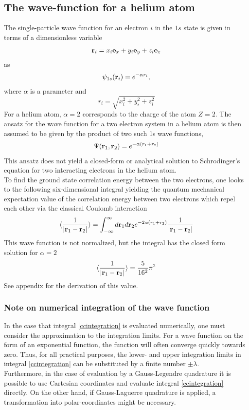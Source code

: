 \documentclass[%
reprint,
amsmath,amssymb,
aps,
]{revtex4-1}
\begin{document}
\subsection{The wave-function for a helium atom} \noindent 
The single-particle wave function for an electron $i$ in the $1s$ state is given in terms of a dimensionless variable 
\begin{equation*}
	 {\bf r}_i =  x_i {\bf e}_x + y_i {\bf e}_y +z_i {\bf e}_z 
\end{equation*}
as 
\begin{equation*}
	\psi_{1s}({\bf r}_i)  =   e^{-\alpha r_i},
\end{equation*}
where $\alpha$ is a parameter and 
\begin{equation*}
	r_i = \sqrt{x_i^2+y_i^2+z_i^2}
\end{equation*}
For a helium atom, $\alpha = 2$ corresponds to the charge of the atom $Z = 2$. The ansatz for the wave function for a two electron system in a helium atom is then assumed to be given by the product of two such 1s wave functions, 
\begin{equation}\label{waveequation}
	\Psi({\bf r}_1,{\bf r}_2)  =   e^{-\alpha (r_1+r_2)}
\end{equation}
This ansatz does not yield a closed-form or analytical solution to Schrodinger's equation for two interacting electrons in the helium atom. \\ \indent 
To find the ground state correlation energy between the two electrons, one looks to the following six-dimensional integral yielding the quantum mechanical expectation value of the correlation energy between two electrons which repel each other via the classical Coulomb interaction
\begin{equation}\label{ccintegration}
	   \langle \frac{1}{|{\bf r}_1-{\bf r}_2|} \rangle =
	\int_{-\infty}^{\infty} d{\bf r}_1d{\bf r}_2  e^{-2\alpha (r_1+r_2)}\frac{1}{|{\bf r}_1-{\bf r}_2|}
\end{equation}
This wave function is not normalized, but the integral has the closed form solution for $\alpha = 2$
\begin{equation*}
\langle \frac{1}{|{\bf r}_1-{\bf r}_2|} \rangle = \dfrac{5}{16^2}\pi^2
\end{equation*}
See appendix for the derivation of this value. 
\subsubsection*{Note on numerical integration of the wave function} \noindent 
In the case that integral \ref{ccintegration} is evaluated numerically, one must consider the approximation to the integration limits. For a wave function on the form of an exponential function, the function will often converge quickly towards zero. Thus, for all practical purposes, the lower- and upper integration limits in integral \ref{ccintegration} can be substituted by a finite number $\pm \lambda$. \\
Furthermore, in the case of evaluation by a Gauss-Legendre quadrature it is possible to use Cartesian coordinates and evaluate integral \ref{ccintegration} directly. On the other hand, if Gauss-Laguerre quadrature is applied, a transformation into polar-coordinates might be necessary.
\end{document}

